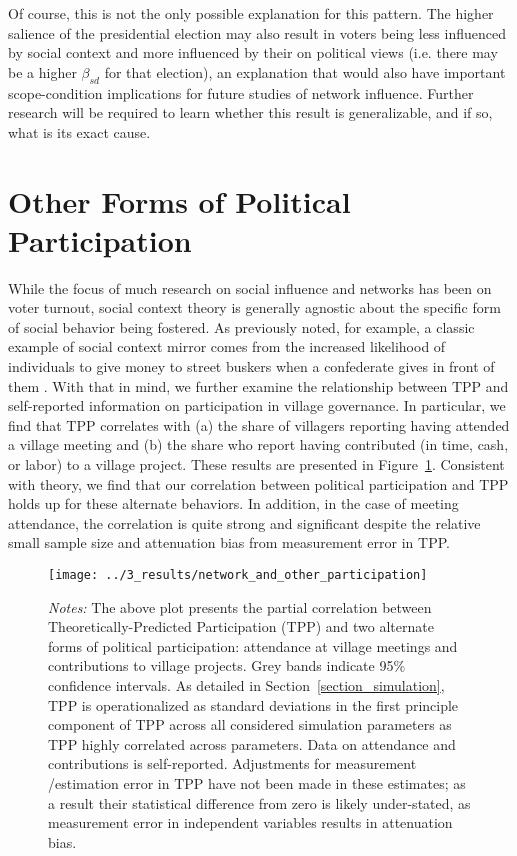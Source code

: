 \documentclass[12pt]{article}
\begin{document}
Of course, this is not the only possible explanation for this pattern. The higher salience of the presidential election may also result in voters being less influenced by social context and more influenced by their on political views (i.e. there may be a higher $\beta_{sd}$ for that election), an explanation that would also have important scope-condition implications for future studies of network influence. Further research will be required to learn whether this result is generalizable, and if so, what is its exact cause.


\section{Other Forms of Political Participation}\label{section_other_political_participation}

While the focus of much research on social influence and networks has been on voter turnout, social context theory is generally agnostic about the specific form of social behavior being fostered. As previously noted, for example, a classic example of social context mirror comes from the increased likelihood of individuals to give money to street buskers when a confederate gives in front of them \citep{Cialdini:2015gt}. With that in mind, we further examine the relationship between TPP and self-reported information on participation in village governance. In particular, we find that TPP correlates with (a) the share of villagers reporting having attended a village meeting and (b) the share who report having contributed (in time, cash, or labor) to a village project. These results are presented in Figure~\ref{figure_otherparticipation}. Consistent with theory, we find that our correlation between political participation and TPP holds up for these alternate behaviors. In addition, in the case of meeting attendance, the correlation is quite strong and significant despite the relative small sample size and attenuation bias from measurement error in TPP.

\begin{figure}[!h]
	\begin{center}
	    \caption{}\label{figure_otherparticipation}
    		\texttt{[image: ../3\_results/network\_and\_other\_participation]}
    \end{center}
	\scriptsize{\emph{Notes:}  The above plot presents the partial correlation between Theoretically-Predicted Participation (TPP) and two alternate forms of political participation: attendance at village meetings and contributions to village projects. Grey bands indicate 95\% confidence intervals. As detailed in Section~\ref{section_simulation}, TPP is operationalized as standard deviations in the first principle component of TPP across all considered simulation parameters as TPP highly correlated across parameters. Data on attendance and contributions is self-reported. Adjustments for measurement /estimation error in TPP have not been made in these estimates; as a result their statistical difference from zero is likely under-stated, as measurement error in independent variables results in attenuation bias.}
\end{figure}
\end{document}
